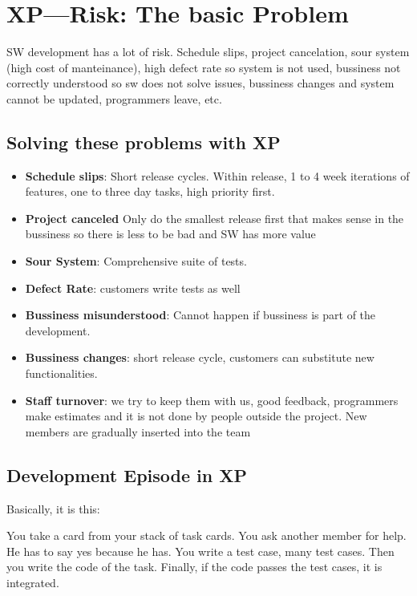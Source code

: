 \documentclass[a4paper,12pt]{article}
\begin{document}
\section{XP---Risk: The basic Problem}
SW development has a lot of risk. Schedule slips, project cancelation, sour system (high cost of manteinance), high defect rate so system is not used, bussiness not correctly understood so sw does not solve issues, bussiness changes and system cannot be updated, programmers leave, etc.

\subsection{Solving these problems with XP}

\begin{itemize}
\item \textbf{Schedule slips}: Short release cycles. Within release, 1 to 4 week iterations of features, one to three day tasks, high priority first.
\item \textbf{Project canceled} Only do the smallest release first that makes sense in the bussiness so there is less to be bad and SW has more value
\item \textbf{Sour System}: Comprehensive suite of tests.
\item \textbf{Defect Rate}: customers write tests as well
\item \textbf{Bussiness misunderstood}: Cannot happen if bussiness is part of the development.
\item \textbf{Bussiness changes}: short release cycle, customers can substitute new functionalities.
\item \textbf{Staff turnover}: we try to keep them with us, good feedback, programmers make estimates and it is not done by people outside the project. New members are gradually inserted into the team
  
\end{itemize}

\subsection{Development Episode in XP}

Basically, it is this:

You take a card from your stack of task cards. You ask another member for help. He has to say yes because he has. You write a test case, many test cases. Then you write the code of the task. Finally, if the code passes the test cases, it is integrated.
\end{document}
